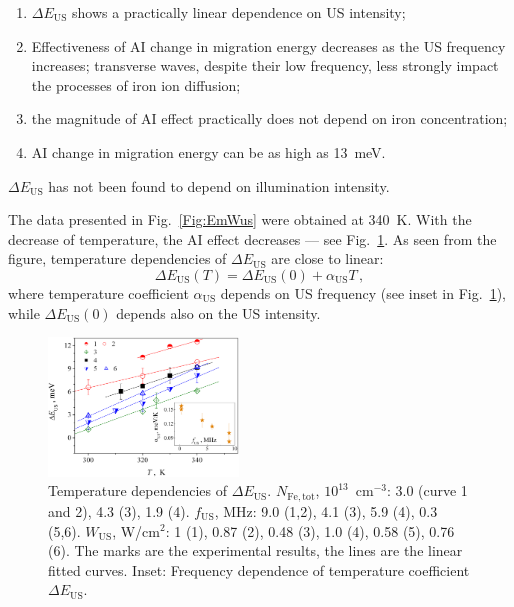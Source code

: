 \documentclass[%
 aip,jap,
 amsmath,amssymb,
 reprint,%
]{revtex4-1}
\begin{document}
\begin{enumerate}
  \item $\Delta E_\mathrm{US}$ shows a practically linear dependence on US intensity;
  \item Effectiveness of AI change in migration energy decreases as the US frequency increases; transverse waves, despite their low frequency, less strongly impact the processes of iron ion diffusion;
  \item the magnitude of AI effect practically does not depend on iron concentration;
  \item AI change in migration energy can be as high as 13~meV.
\end{enumerate}

$\Delta E_\mathrm{US}$ has not been found to depend on illumination intensity.

The data presented in Fig.~\ref{Fig:EmWus} were obtained at 340~K.
With the decrease of temperature, the AI effect  decreases –-- see Fig.~\ref{Fig:EmT}.
As seen from the figure, temperature dependencies of $\Delta E_\mathrm{US}$ are close to linear:
\begin{equation}
\label{eqEmT}
\Delta E_\mathrm{US}(T)=\Delta E_\mathrm{US}(0)+\alpha_\mathrm{US}T\,,
\end{equation}
where temperature coefficient $\alpha_\mathrm{US}$ depends on US frequency
(see inset in Fig.~\ref{Fig:EmT}), while $\Delta E_\mathrm{US}(0)$ depends also on the US intensity.

\begin{figure}
\includegraphics[width=0.45\textwidth]{Fig6}%
\caption{\label{Fig:EmT}
Temperature dependencies of $\Delta E_\mathrm{US}$.
$N_\mathrm{Fe,tot}$, $10^{13}$~cm$^{-3}$:
3.0 (curve 1 and 2), 4.3 (3), 1.9 (4).
$f_\mathrm{US}$, MHz: 9.0 (1,2), 4.1 (3), 5.9 (4), 0.3 (5,6).
$W_\mathrm{US}$, W/cm$^2$: 1 (1), 0.87 (2), 0.48 (3), 1.0 (4), 0.58 (5), 0.76 (6).
The marks are the experimental results, the lines are the linear fitted curves.
Inset: Frequency dependence of temperature coefficient $\Delta E_\mathrm{US}$.
}
\end{figure}
\end{document}
